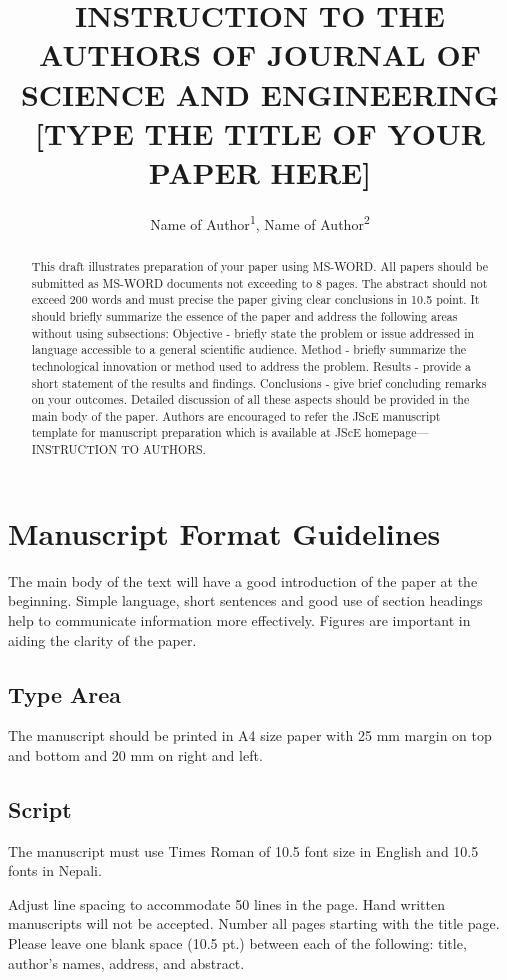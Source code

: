 \documentclass{jsce-word}
\title{INSTRUCTION TO THE AUTHORS OF JOURNAL OF SCIENCE AND ENGINEERING\\
  {[TYPE THE TITLE OF YOUR PAPER HERE]}}
\author{Name of Author\textsuperscript{1}, Name of Author\textsuperscript{2}}
\affiliation{\textsuperscript{1}Affiliation\\\textsuperscript{2}Affiliation}
\begin{document}
\begin{abstract}
This draft illustrates preparation of your paper using MS-WORD. All papers should be
submitted as MS-WORD documents not exceeding to 8 pages. The abstract should not exceed 200
words and must precise the paper giving clear conclusions in 10.5 point. It should briefly
summarize the essence of the paper and address the following areas without using
subsections: Objective - briefly state the problem or issue addressed in language accessible
to a general scientific audience. Method - briefly summarize the technological innovation or
method used to address the problem. Results - provide a short statement of the results and
findings. Conclusions - give brief concluding remarks on your outcomes. Detailed discussion
of all these aspects should be provided in the main body of the paper. Authors are
encouraged to refer the JScE manuscript template for manuscript preparation which is
available at JScE homepage---INSTRUCTION TO AUTHORS.
\end{abstract}

\maketitle

\section{Manuscript Format Guidelines}

The main body of the text will have a good introduction of the paper at the beginning.
Simple language, short sentences and good use of section headings help to communicate
information more effectively. Figures are important in aiding the clarity of the paper.

\subsection{Type Area}
The manuscript should be printed in A4 size paper with 25 mm margin on top and bottom and
20 mm on right and left.

\subsection{Script}
The manuscript must use Times Roman of 10.5 font size in English and 10.5 fonts in Nepali.

Adjust line spacing to accommodate 50 lines in the page. Hand written manuscripts will not
be accepted. Number all pages starting with the title page. Please leave one blank space
(10.5 pt.) between each of the following: title, author's names, address, and abstract.
\end{document}
